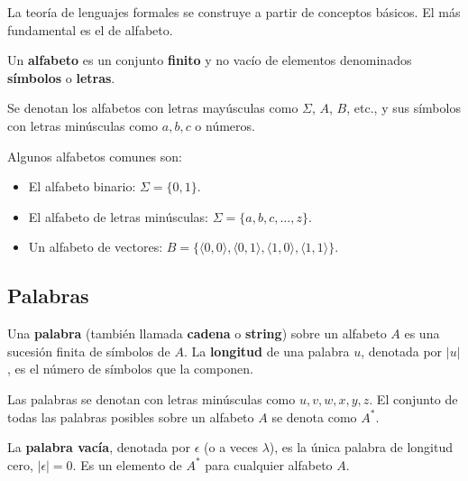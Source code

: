 La teoría de lenguajes formales se construye a partir de conceptos básicos. El más fundamental es el de alfabeto.

\begin{definicion}[Alfabeto]
Un \textbf{alfabeto} es un conjunto \textbf{finito} y no vacío de elementos denominados \textbf{símbolos} o \textbf{letras}.
\end{definicion}

\begin{anotacion}
Se denotan los alfabetos con letras mayúsculas como $\Sigma$, $A$, $B$, etc., y sus símbolos con letras minúsculas como $a, b, c$ o números.
\end{anotacion}

\begin{ejemplo}
Algunos alfabetos comunes son:
\begin{itemize}
    \item El alfabeto binario: $\Sigma = \{0, 1\}$.
    \item El alfabeto de letras minúsculas: $\Sigma = \{a, b, c, \dots, z\}$.
    \item Un alfabeto de vectores: $B = \{\langle 0,0 \rangle, \langle 0,1 \rangle, \langle 1,0 \rangle, \langle 1,1 \rangle\}$.
\end{itemize}
\end{ejemplo}

\subsection{Palabras}

\begin{definicion}[Palabra]
Una \textbf{palabra} (también llamada \textbf{cadena} o \textbf{string}) sobre un alfabeto $A$ es una sucesión finita de símbolos de $A$. La \textbf{longitud} de una palabra $u$, denotada por $|u|$, es el número de símbolos que la componen.
\end{definicion}

\begin{anotacion}
Las palabras se denotan con letras minúsculas como $u, v, w, x, y, z$. El conjunto de todas las palabras posibles sobre un alfabeto $A$ se denota como $A^*$.
\end{anotacion}

\begin{definicion}
La \textbf{palabra vacía}, denotada por $\epsilon$ (o a veces $\lambda$), es la única palabra de longitud cero, $| \epsilon | = 0$. Es un elemento de $A^*$ para cualquier alfabeto $A$.
\end{definicion}

